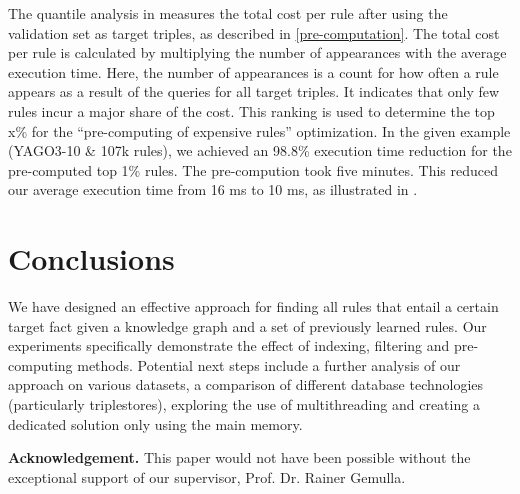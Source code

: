 \documentclass[english]{lni}
\begin{document}
The quantile analysis in  measures the total cost per rule after using the validation set as target triples, as described in \ref{pre-computation}. The total cost per rule is calculated by multiplying the number of appearances with the average execution time. Here, the number of appearances is a count for how often a rule appears as a result of the queries for all target triples.  It indicates that only few rules incur a major share of the cost. This ranking is used to determine the top x\% for the “pre-computing of expensive rules” optimization. In the given example (YAGO3-10 \& 107k rules), we achieved an 98.8\% execution time reduction for the pre-computed top 1\% rules. The pre-compution took five minutes. This reduced our average execution time from 16 ms to 10 ms, as illustrated in .


\section{Conclusions}

%
%

We have designed an effective approach for finding all rules that entail a certain target fact given a knowledge graph and a set of previously learned rules. Our experiments specifically demonstrate the effect of indexing, filtering and pre-computing methods. Potential next steps include a further analysis of our approach on various datasets, a comparison of different database technologies (particularly triplestores), exploring the use of multithreading and creating a dedicated solution only using the main memory.

\textbf{Acknowledgement.} This paper would not have been possible without the exceptional support of our supervisor, Prof. Dr. Rainer Gemulla.

\end{document}
